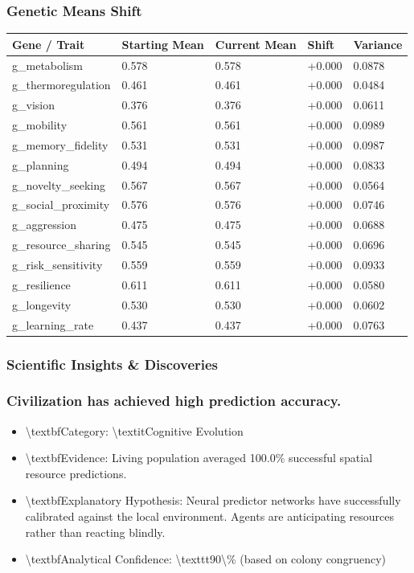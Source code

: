 \documentclass[11pt,a4paper]{article}
\begin{document}
\subsubsection*{ Genetic Means Shift}
\begin{longtable}{lllll}
\toprule
Gene / Trait & Starting Mean & Current Mean & Shift & Variance \\
\midrule
\endhead
g\_metabolism & 0.578 & 0.578 & +0.000 & 0.0878 \\
g\_thermoregulation & 0.461 & 0.461 & +0.000 & 0.0484 \\
g\_vision & 0.376 & 0.376 & +0.000 & 0.0611 \\
g\_mobility & 0.561 & 0.561 & +0.000 & 0.0989 \\
g\_memory\_fidelity & 0.531 & 0.531 & +0.000 & 0.0987 \\
g\_planning & 0.494 & 0.494 & +0.000 & 0.0833 \\
g\_novelty\_seeking & 0.567 & 0.567 & +0.000 & 0.0564 \\
g\_social\_proximity & 0.576 & 0.576 & +0.000 & 0.0746 \\
g\_aggression & 0.475 & 0.475 & +0.000 & 0.0688 \\
g\_resource\_sharing & 0.545 & 0.545 & +0.000 & 0.0696 \\
g\_risk\_sensitivity & 0.559 & 0.559 & +0.000 & 0.0933 \\
g\_resilience & 0.611 & 0.611 & +0.000 & 0.0580 \\
g\_longevity & 0.530 & 0.530 & +0.000 & 0.0602 \\
g\_learning\_rate & 0.437 & 0.437 & +0.000 & 0.0763 \\
\bottomrule
\end{longtable}

\subsubsection*{ Scientific Insights \& Discoveries}
\subsubsection*{ Civilization has achieved high prediction accuracy.}
\begin{itemize}
  \item \textbackslash{}textbf{Category:} \textbackslash{}textit{Cognitive Evolution}
  \item \textbackslash{}textbf{Evidence:} Living population averaged 100.0\% successful spatial resource predictions.
  \item \textbackslash{}textbf{Explanatory Hypothesis:} Neural predictor networks have successfully calibrated against the local environment. Agents are anticipating resources rather than reacting blindly.
  \item \textbackslash{}textbf{Analytical Confidence:} \textbackslash{}texttt{90\textbackslash{}\%} (based on colony congruency)
\end{itemize}
\end{document}
